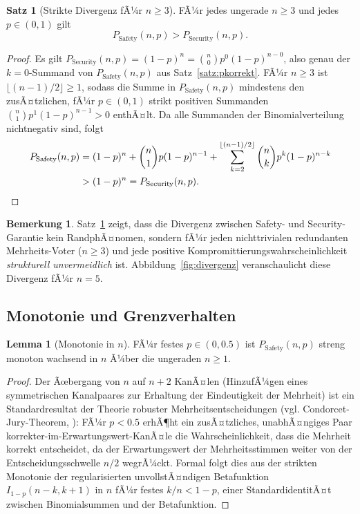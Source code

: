 ﻿\documentclass[a4paper,12pt]{article}
\theoremstyle{definition}
\newtheorem{satz}{Satz}
\newtheorem{lemma}{Lemma}
\newtheorem{bemerkung}{Bemerkung}
\begin{document}
\begin{satz}[Strikte Divergenz fÃ¼r $n \geq 3$]
	\label{satz:divergenz}
	FÃ¼r jedes ungerade $n \geq 3$ und jedes $p \in (0,1)$ gilt
	\[
	P_{\mathrm{Safety}}(n,p) > P_{\mathrm{Security}}(n,p).
	\]
\end{satz}

\begin{proof}
	Es gilt $P_{\mathrm{Security}}(n,p) = (1-p)^n = \binom{n}{0}p^0(1-p)^{n-0}$, also genau der $k=0$-Summand von $P_{\mathrm{Safety}}(n,p)$ aus Satz~\ref{satz:pkorrekt}. FÃ¼r $n \geq 3$ ist $\lfloor (n-1)/2 \rfloor \geq 1$, sodass die Summe in $P_{\mathrm{Safety}}(n,p)$ mindestens den zusÃ¤tzlichen, fÃ¼r $p \in (0,1)$ strikt positiven Summanden $\binom{n}{1}p^1(1-p)^{n-1} > 0$ enthÃ¤lt. Da alle Summanden der Binomialverteilung nichtnegativ sind, folgt
	\begin{align*}
	P_{\mathrm{Safety}}(n,p) &= (1-p)^n + \binom{n}{1}p(1-p)^{n-1} + \sum_{k=2}^{\lfloor (n-1)/2\rfloor} \binom{n}{k}p^k(1-p)^{n-k} \\
	&> (1-p)^n = P_{\mathrm{Security}}(n,p). \qedhere
	\end{align*}
\end{proof}

\begin{bemerkung}
	Satz~\ref{satz:divergenz} zeigt, dass die Divergenz zwischen Safety- und Security-Garantie kein RandphÃ¤nomen, sondern fÃ¼r jeden nichttrivialen redundanten Mehrheits-Voter ($n\geq 3$) und jede positive Kompromittierungswahrscheinlichkeit \emph{strukturell unvermeidlich} ist. Abbildung~\ref{fig:divergenz} veranschaulicht diese Divergenz fÃ¼r $n=5$.
\end{bemerkung}

\subsection{Monotonie und Grenzverhalten}

\begin{lemma}[Monotonie in $n$]
	\label{lem:monotonie}
	FÃ¼r festes $p \in (0, 0.5)$ ist $P_{\mathrm{Safety}}(n,p)$ streng monoton wachsend in $n$ Ã¼ber die ungeraden $n \geq 1$.
\end{lemma}

\begin{proof}
	Der Ãœbergang von $n$ auf $n+2$ KanÃ¤len (HinzufÃ¼gen eines symmetrischen Kanalpaares zur Erhaltung der Eindeutigkeit der Mehrheit) ist ein Standardresultat der Theorie robuster Mehrheitsentscheidungen (vgl. Condorcet-Jury-Theorem, \cite{condorcet1785}): FÃ¼r $p < 0.5$ erhÃ¶ht ein zusÃ¤tzliches, unabhÃ¤ngiges Paar korrekter-im-Erwartungswert-KanÃ¤le die Wahrscheinlichkeit, dass die Mehrheit korrekt entscheidet, da der Erwartungswert der Mehrheitsstimmen weiter von der Entscheidungsschwelle $n/2$ wegrÃ¼ckt. Formal folgt dies aus der strikten Monotonie der regularisierten unvollstÃ¤ndigen Betafunktion $I_{1-p}(n-k,k+1)$ in $n$ fÃ¼r festes $k/n < 1-p$, einer StandardidentitÃ¤t zwischen Binomialsummen und der Betafunktion. \qedhere
\end{proof}
\end{document}
